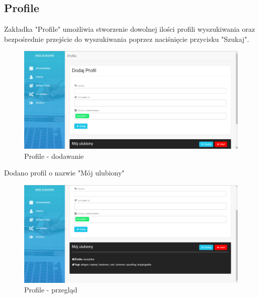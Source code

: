 \documentclass[12pt, titlepage]{article}
\begin{document}
	\newpage
	\subsection{Profile}
	Zakładka "Profile" umożliwia stworzenie dowolnej ilości profili wyszukiwania oraz bezpośrednie przejście do wyszukiwania poprzez naciśnięcie przycisku "Szukaj".
	\begin{figure}[H]
	\centering
	\includegraphics[scale=0.40]{obrazki/profile1.png}
	\caption{Profile - dodawanie}
	\label{fig:db_schema}
	\end{figure}
	\newpage
	Dodano profil o nazwie "Mój ulubiony"
	\begin{figure}[H]
		\centering
		\includegraphics[scale=0.40]{obrazki/profile2.png}
		\caption{Profile - przegląd}
		\label{fig:db_schema}
	\end{figure}

	
	\newpage
\end{document}
